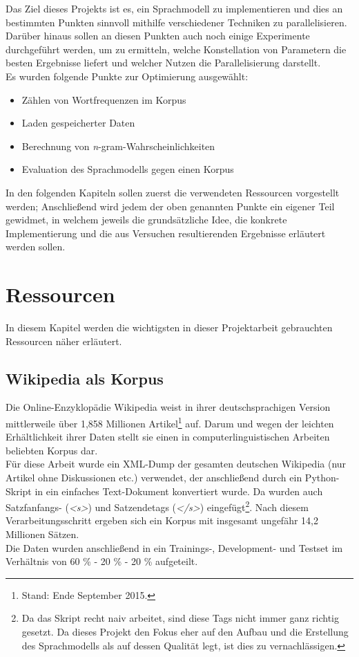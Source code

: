 \documentclass[a4paper,12pt]{scrartcl}
\begin{document}
    Das Ziel dieses Projekts ist es, ein Sprachmodell zu implementieren und dies an bestimmten Punkten sinnvoll mithilfe verschiedener Techniken zu parallelisieren. Darüber hinaus sollen an diesen Punkten auch noch einige Experimente durchgeführt werden, um zu ermitteln, welche Konstellation von Parametern die besten Ergebnisse liefert und welcher Nutzen die Parallelisierung darstellt. \\

    Es wurden folgende Punkte zur Optimierung ausgewählt:
    \begin{itemize}
        \item Zählen von Wortfrequenzen im Korpus
        \item Laden gespeicherter Daten
        \item Berechnung von \emph{n}-gram-Wahrscheinlichkeiten
        \item Evaluation des Sprachmodells gegen einen Korpus
    \end{itemize}

    In den folgenden Kapiteln sollen zuerst die verwendeten Ressourcen vorgestellt werden; Anschließend wird jedem der oben genannten Punkte ein eigener Teil gewidmet, in welchem jeweils die grundsätzliche Idee, die konkrete Implementierung und die aus Versuchen resultierenden Ergebnisse erläutert werden sollen.

\section{Ressourcen}

    In diesem Kapitel werden die wichtigsten in dieser Projektarbeit gebrauchten Ressourcen näher erläutert.

    \subsection{Wikipedia als Korpus}

    Die Online-Enzyklopädie Wikipedia weist in ihrer deutschsprachigen Version mittlerweile über 1,858 Millionen Artikel\footnote{Stand: Ende September 2015.} auf. Darum und wegen der leichten Erhältlichkeit ihrer Daten stellt sie einen in computerlinguistischen Arbeiten beliebten Korpus dar. \\
    Für diese Arbeit wurde ein XML-Dump der gesamten deutschen Wikipedia (nur Artikel ohne Diskussionen etc.) verwendet, der anschließend durch ein Python-Skript in ein einfaches Text-Dokument konvertiert wurde. Da wurden auch Satzfanfangs- (\emph{<s>}) und Satzendetags (\emph{</s>}) eingefügt\footnote{Da das Skript recht naiv arbeitet, sind diese Tags nicht immer ganz richtig gesetzt. Da dieses Projekt den Fokus eher auf den Aufbau und die Erstellung des Sprachmodells als auf dessen Qualität legt, ist dies zu vernachlässigen.}. Nach diesem Verarbeitungsschritt ergeben sich ein Korpus mit insgesamt ungefähr 14,2 Millionen Sätzen. \\
    Die Daten wurden anschließend in ein Trainings-, Development- und Testset im Verhältnis von 60 \% - 20 \% - 20 \% aufgeteilt.
\end{document}
